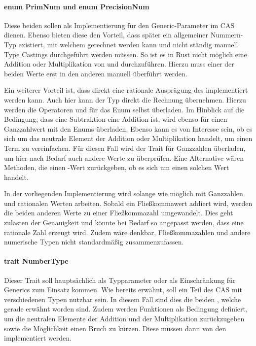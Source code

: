 \documentclass[11pt,a4paper, ngerman]{article}
\begin{document}
\label{sec:NumTypes}
\paragraph{enum PrimNum und enum PrecisionNum} Diese beiden  sollen als Implementierung für den Generic-Parameter im CAS dienen. Ebenso bieten diese den Vorteil, dass später ein allgemeiner Nummern-Typ existiert, mit welchem gerechnet werden kann und nicht ständig manuell Type Castings durchgeführt werden müssen. So ist es in Rust nicht möglich eine Addition oder Multiplikation von  und  durchzuführen. Hierzu muss einer der beiden Werte erst in den anderen manuell überführt werden.

Ein weiterer Vorteil ist, dass direkt eine rationale Ausprägung des  implementiert werden kann. Auch hier kann der Typ direkt die Rechnung übernehmen. Hierzu werden die Operatoren  und  für das Enum selbst überladen. Im Hinblick auf die Bedingung, dass eine Subtraktion eine Addition ist, wird ebenso  für einen Ganzzahlwert mit den Enums überladen. Ebenso kann es von Interesse sein, ob es sich um das neutrale Element der Addition oder Multiplikation handelt, um einen Term zu vereinfachen. Für diesen Fall wird der Trait  für Ganzzahlen überladen, um hier nach Bedarf auch andere Werte zu überprüfen. Eine Alternative wären Methoden, die einen -Wert zurückgeben, ob es sich um einen solchen Wert handelt.

In der vorliegenden Implementierung wird  solange wie möglich mit Ganzzahlen und rationalen Werten arbeiten. Sobald ein Fließkommawert addiert wird, werden die beiden anderen Werte zu einer Fließkommazahl umgewandelt. Dies geht zulasten der Genauigkeit und könnte bei Bedarf so angepasst werden, dass eine rationale Zahl erzeugt wird. Zudem wäre denkbar, Fließkommazahlen und andere numerische Typen nicht standardmäßig zusammenzufassen.

\paragraph{trait NumberType} Dieser Trait soll hauptsächlich als Typparameter oder als Einschränkung für Generics zum Einsatz kommen. Wie bereits erwähnt, soll ein Teil des CAS mit verschiedenen Typen nutzbar sein. In diesem Fall sind dies die beiden , welche gerade erwähnt worden sind. Zudem werden Funktionen als Bedingung definiert, um die neutralen Elemente der Addition und der Multiplikation zurückzugeben sowie die Möglichkeit einen Bruch zu kürzen. Diese müssen dann von den  implementiert werden.
\end{document}
